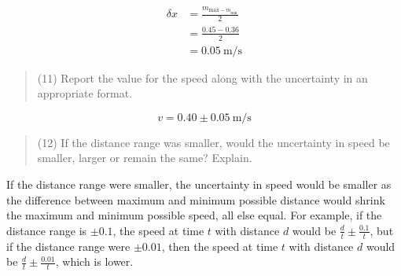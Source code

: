 \documentclass[8pt]{extarticle}
\newcommand{\plain}[1]{\textrm{#1}}
\begin{document}
\begin{align*}
	\delta x &= \frac{m_{\plain{max} - m_{\plain{min}}}}{2} \\
	&= \frac{0.45 - 0.36}{2} \\
	&= 0.05~\plain{m/s}
\end{align*}
\begin{quote}
	(11) Report the value for the speed along with the uncertainty in an appropriate format.
\end{quote}
\[ v = 0.40 \pm  0.05~\plain{m/s}\]
\begin{quote}
	(12) If the distance range was smaller, would the uncertainty in speed be smaller, larger or remain the same? Explain. 
\end{quote}
If the distance range were smaller, the uncertainty in speed would be smaller as the difference between maximum and minimum possible distance would shrink the maximum and minimum possible speed, all else equal. For example, if the distance range is $\pm 0.1$, the speed at time $t$ with distance $d$ would be $\frac{d}{t} \pm \frac{0.1}{t}$, but if the distance range were $\pm 0.01$, then the speed at time $t$ with distance $d$ would be $\frac{d}{t} \pm \frac{0.01}{t}$, which is lower.
\end{document}
